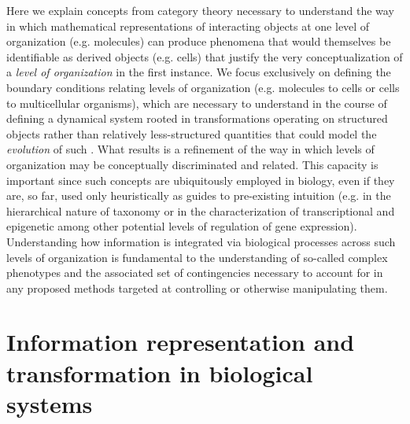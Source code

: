 \documentclass[aps,twocolumn]{revtex4-1}
\begin{document}
Here we explain concepts from category theory necessary to understand the way in which mathematical representations of interacting objects at one level of organization (e.g. molecules) can produce phenomena that would themselves be identifiable as derived objects (e.g. cells) that justify the very conceptualization of a \emph{level of organization} in the first instance. We focus exclusively on defining the boundary conditions relating levels of organization (e.g. molecules to cells or cells to multicellular organisms), which are necessary to understand in the course of defining a dynamical system rooted in transformations operating on structured objects rather than relatively less-structured quantities that could model the \emph{evolution} of such \cite{Fontana1994,Fontana1994a,Fontana1996}. What results is a refinement of the way in which levels of organization may be conceptually discriminated and related. This capacity is important since such concepts are ubiquitously employed in biology, even if they are, so far, used only heuristically as guides to pre-existing intuition (e.g. in the hierarchical nature of taxonomy or in the characterization of transcriptional and epigenetic among other potential levels of regulation of gene expression). Understanding how information is integrated via biological processes across such levels of organization is fundamental to the understanding of so-called complex phenotypes and the associated set of contingencies necessary to account for in any proposed methods targeted at controlling or otherwise manipulating them.

\section{Information representation and transformation in biological systems}

\end{document}
